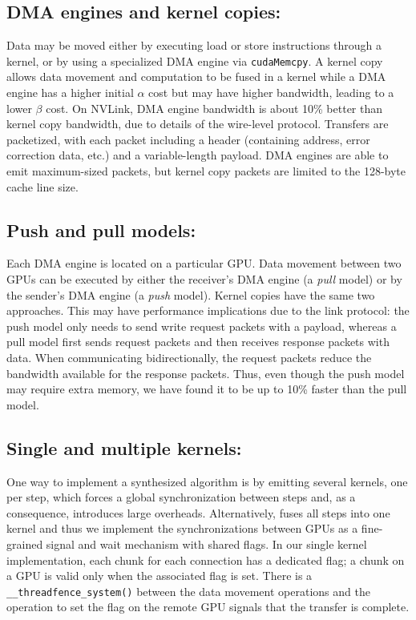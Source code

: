 \subsection{DMA engines and kernel copies:} Data may be moved either by
executing load or store instructions through a kernel, or by using a
specialized DMA engine via \texttt{cudaMemcpy}. A kernel copy allows
data movement and computation to be fused in a kernel while a DMA
engine has a higher initial $\alpha$ cost but may have higher
bandwidth, leading to a lower $\beta$ cost. On NVLink, DMA engine
bandwidth is about 10\% better than kernel copy bandwidth, due to
details of the wire-level protocol. Transfers are packetized, with
each packet including a header (containing address, error correction
data, etc.) and a variable-length payload. DMA engines are able to
emit maximum-sized packets, but kernel copy packets are limited to the
128-byte cache line size.

\subsection{Push and pull models:} Each DMA engine is located on a
particular GPU. Data movement between two GPUs can be executed by
either the receiver's DMA engine (a {\em pull} model) or by the
sender's DMA engine (a {\em push} model). Kernel copies have the same
two approaches. This may have performance implications due to the link
protocol: the push model only needs to send write request packets with
a payload, whereas a pull model first sends request packets and then
receives response packets with data. When communicating
bidirectionally, the request packets reduce the bandwidth available
for the response packets. Thus, even though the push model may require
extra memory, we have found it to be up to 10\% faster than the pull
model.



\subsection{Single and multiple kernels:} One way to implement a
synthesized algorithm is by emitting several kernels, one per step,
which forces a global synchronization between steps and, as a
consequence, introduces large overheads. Alternatively, \tool{} fuses
all steps into one kernel and thus we implement the synchronizations
between GPUs as a fine-grained signal and wait mechanism with shared
flags. In our single kernel implementation, each chunk for each
connection has a dedicated flag; a chunk on a GPU is valid only when
the associated flag is set. There is a
\texttt{\_\_threadfence\_system()} between the data movement
operations and the operation to set the flag on the remote GPU signals
that the transfer is complete.

